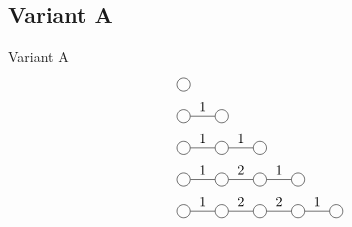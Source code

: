 \documentclass[aspectratio=169]{beamer}
\begin{document}
\subsection{Variant A}

\begin{frame}{Variant A}
    \begin{equation}
        \begin{split}
            &\mpob{1}{ {,}  }{}{}{}{{,,}} \\
            &\mpob{2}{ {,"1",}  }{}{}{}{{,,}}\\
            &\mpob{3}{ {,"1","1",}  }{}{}{}{{,,,}}\\
            &\mpob{4}{ {,"1","2","1",}  }{}{}{}{{,,,,,}}\\
            &\mpob{5}{ {,"1","2","2","1",}  }{}{}{}{{,,,,,}}\\
        \end{split}
    \end{equation}

\end{frame}




\end{document}
